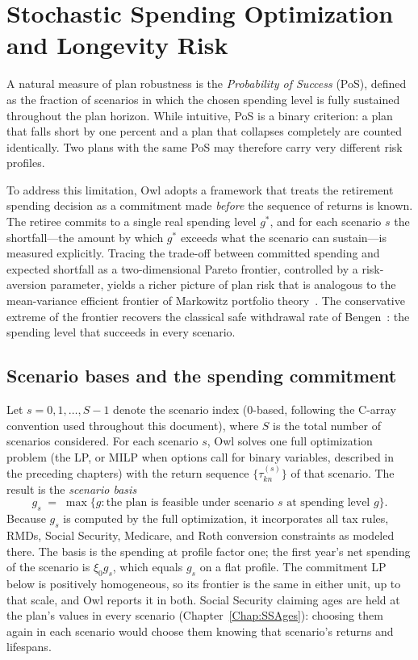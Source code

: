 \documentclass[fleqn,12pt]{report}
\begin{document}
\chapter{Stochastic Spending Optimization and Longevity Risk}
\label{chap:stochastic-spending}

A natural measure of plan robustness is the \textit{Probability of Success} (PoS), defined as
the fraction of scenarios in which the chosen spending level is fully sustained throughout the
plan horizon.
While intuitive, PoS is a binary criterion: a plan that falls short by one percent and a plan
that collapses completely are counted identically.
Two plans with the same PoS may therefore carry very different risk profiles.

To address this limitation, Owl adopts a framework that treats the retirement spending decision
as a commitment made \emph{before} the sequence of returns is known.
The retiree commits to a single real spending level $g^*$, and for each scenario
$s$ the shortfall---the amount by which $g^*$ exceeds what the scenario can
sustain---is measured explicitly.
Tracing the trade-off between committed spending and expected shortfall as a two-dimensional
Pareto frontier, controlled by a risk-aversion parameter, yields a richer picture of plan
risk that is analogous to the mean-variance efficient frontier of Markowitz
portfolio theory~\cite{markowitz1952}.
The conservative extreme of the frontier recovers the classical safe withdrawal rate
of Bengen~\cite{bengen1994}: the spending level that succeeds in every scenario.

\section[Scenario bases]{Scenario bases and the spending commitment}

Let $s = 0, 1, \ldots, S-1$ denote the scenario index (0-based, following the
C-array convention used throughout this document), where $S$ is the total number
of scenarios considered.
For each scenario $s$, Owl solves one full optimization problem
(the LP, or MILP when options call for binary variables, described in the preceding chapters)
with the return sequence $\{\tau_{kn}^{(s)}\}$ of that scenario.
The result is the \textit{scenario basis}
\begin{equation}
    \label{Eq:ScenarioBasis}
    g_s \;=\; \max\bigl\{g : \text{the plan is feasible under scenario } s
                         \text{ at spending level } g\bigr\}.
\end{equation}
Because $g_s$ is computed by the full optimization, it incorporates all tax rules, RMDs,
Social Security, Medicare, and Roth conversion constraints as modeled there.
The basis is the spending at profile factor one; the first year's net spending of the
scenario is $\xi_0 g_s$, which equals $g_s$ on a flat profile.
The commitment LP below is positively homogeneous, so its frontier is the same in either unit,
up to that scale, and Owl reports it in both.
Social Security claiming ages are held at the plan's values in every scenario
(Chapter~\ref{Chap:SSAges}): choosing them again in each scenario would choose them knowing
that scenario's returns and lifespans.
\end{document}
